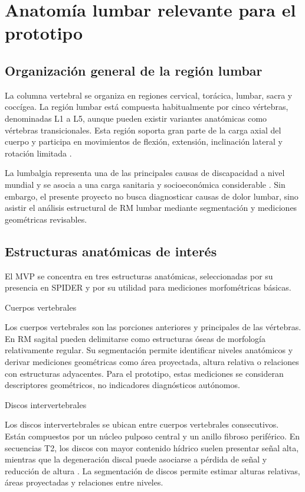 \section{Anatomía lumbar relevante para el prototipo}

\subsection{Organización general de la región lumbar}

La columna vertebral se organiza en regiones cervical, torácica, lumbar, sacra y coccígea. La región lumbar está compuesta habitualmente por cinco vértebras, denominadas L1 a L5, aunque pueden existir variantes anatómicas como vértebras transicionales. Esta región soporta gran parte de la carga axial del cuerpo y participa en movimientos de flexión, extensión, inclinación lateral y rotación limitada \parencite{standring_grays_2020}.

La lumbalgia representa una de las principales causas de discapacidad a nivel mundial y se asocia a una carga sanitaria y socioeconómica considerable \parencite{hoy_low_back_pain_2014}. Sin embargo, el presente proyecto no busca diagnosticar causas de dolor lumbar, sino asistir el análisis estructural de RM lumbar mediante segmentación y mediciones geométricas revisables.

\subsection{Estructuras anatómicas de interés}

El MVP se concentra en tres estructuras anatómicas, seleccionadas por su presencia en SPIDER y por su utilidad para mediciones morfométricas básicas.

Cuerpos vertebrales

Los cuerpos vertebrales son las porciones anteriores y principales de las vértebras. En RM sagital pueden delimitarse como estructuras óseas de morfología relativamente regular. Su segmentación permite identificar niveles anatómicos y derivar mediciones geométricas como área proyectada, altura relativa o relaciones con estructuras adyacentes. Para el prototipo, estas mediciones se consideran descriptores geométricos, no indicadores diagnósticos autónomos.

Discos intervertebrales

Los discos intervertebrales se ubican entre cuerpos vertebrales consecutivos. Están compuestos por un núcleo pulposo central y un anillo fibroso periférico. En secuencias T2, los discos con mayor contenido hídrico suelen presentar señal alta, mientras que la degeneración discal puede asociarse a pérdida de señal y reducción de altura \parencite{modic_disk_1988}. La segmentación de discos permite estimar alturas relativas, áreas proyectadas y relaciones entre niveles.

